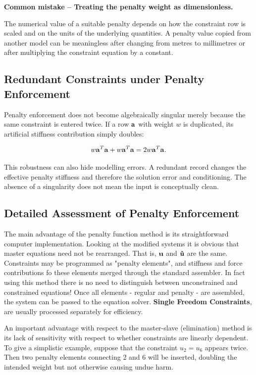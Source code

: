 \begin{bbox}
\textbf{Common mistake -- Treating the penalty weight as dimensionless.}

The numerical value of a suitable penalty depends on how the constraint row is
scaled and on the units of the underlying quantities. A penalty value copied
from another model can be meaningless after changing from metres to millimetres
or after multiplying the constraint equation by a constant.
\end{bbox}

\subsection{Redundant Constraints under Penalty Enforcement}

Penalty enforcement does not become algebraically singular merely because the
same constraint is entered twice. If a row $\mathbf{a}$ with weight $w$ is duplicated,
its artificial stiffness contribution simply doubles:

\begin{equation}
    w\mathbf{a}^T\mathbf{a}+w\mathbf{a}^T\mathbf{a}
    =2w\mathbf{a}^T\mathbf{a}.
\end{equation}

This robustness can also hide modelling errors. A redundant record changes the
effective penalty stiffness and therefore the solution error and conditioning.
The absence of a singularity does not mean the input is conceptually clean.

\subsection{Detailed Assessment of Penalty Enforcement}

The main advantage of the penalty function method is its straightforward computer
implementation. Looking at the modified systems it is obvious that master equations
need not be rearranged. That is, $ \mathbf{u} $ and $ \mathbf{\hat{u}} $ are the same.
Constraints may be programmed as "penalty elements", and stiffness and force
contributions fo these elements merged through the standard assembler. In fact
using this method there is no need to distinguish between unconstrained and
constrained equations! Once all elements - regular and penalty - are assembled,
the system can be passed to the equation solver. \textbf{Single Freedom Constraints},
are usually processed separately for efficiency.

An important advantage with respect to the master-slave (elimination) method
is its lack of sensitivity with respect to whether constraints are linearly
dependent. To give a simplistic example, suppose that the constraint
$ u_2 = u_6 $ appears twice. Then two penalty elements connecting 2 and 6 will
be inserted, doubling the intended weight but not otherwise causing undue harm.

